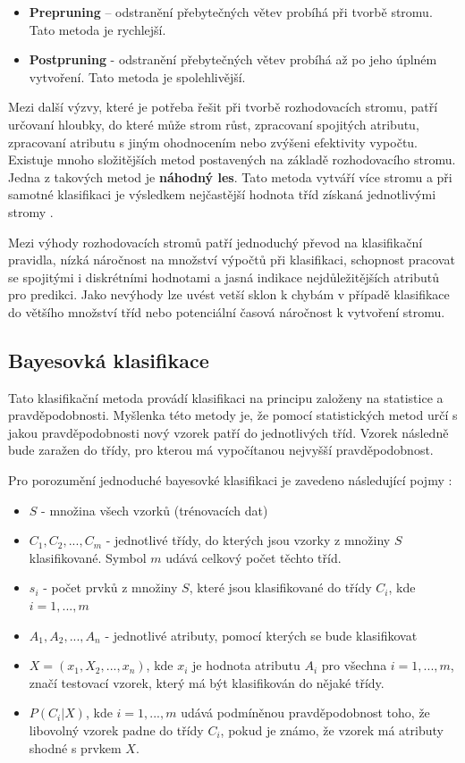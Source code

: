 \begin{itemize}
    \item \textbf{Prepruning} – odstranění přebytečných větev probíhá při tvorbě stromu. Tato metoda je rychlejší.
    \item \textbf{Postpruning} - odstranění přebytečných větev probíhá až po jeho úplném vytvoření. Tato metoda je spolehlivější.
\end{itemize}


Mezi další výzvy, které je potřeba řešit při tvorbě rozhodovacích stromu, patří určovaní hloubky, do které může strom růst, zpracovaní spojitých atributu,  zpracovaní atributu s jiným ohodnocením nebo zvýšeni efektivity vypočtu. Existuje mnoho složitějších metod postavených na základě rozhodovacího stromu. Jedna z takových metod je \textbf{náhodný les}. Tato metoda vytváří více stromu a při samotné klasifikaci je výsledkem nejčastější hodnota tříd získaná jednotlivými stromy  \cite{Han}.

Mezi výhody rozhodovacích stromů patří jednoduchý převod na klasifikační pravidla, nízká náročnost na množství výpočtů při klasifikaci, schopnost pracovat se spojitými i diskrétními hodnotami a jasná indikace nejdůležitějších atributů pro predikci. Jako nevýhody lze uvést vetší sklon k chybám v případě klasifikace do většího množství tříd nebo potenciální časová náročnost k vytvoření stromu. \cite{Lior}

\subsection*{Bayesovká klasifikace}
Tato klasifikační metoda provádí klasifikaci na principu založeny na statistice a pravděpodobnosti. Myšlenka této metody je, že pomocí statistických metod určí s jakou  pravděpodobnosti nový vzorek patří do jednotlivých tříd. Vzorek následně bude zaražen do třídy, pro kterou má vypočítanou nejvyšší pravděpodobnost. 

Pro porozumění jednoduché bayesovké klasifikaci je zavedeno následující pojmy \cite{Han}:

\begin{itemize}
    \item $S$ - množina všech vzorků (trénovacích dat)
    \item $C_1, C_2,...,C_m$ - jednotlivé třídy, do kterých jsou vzorky z množiny $S$ klasifikované. Symbol $m$ udává celkový počet těchto tříd.
    \item $s_i$ - počet prvků z množiny $S$, které jsou klasifikované do třídy $C_i$, kde $i=1,...,m$
    \item $A_1, A_2,...,A_n$ - jednotlivé atributy, pomocí kterých se bude klasifikovat
    \item $X = (x_1,X_2,...,x_n)$, kde $x_i$ je hodnota atributu $A_i$ pro všechna $i=1,...,m$, značí testovací vzorek, který má být klasifikován do nějaké třídy.
    \item $P(C_i|X)$, kde $i=1,...,m$ udává podmíněnou pravděpodobnost toho, že libovolný vzorek padne do třídy $C_i$, pokud je známo, že vzorek má atributy shodné s prvkem $X$.
\end{itemize}

